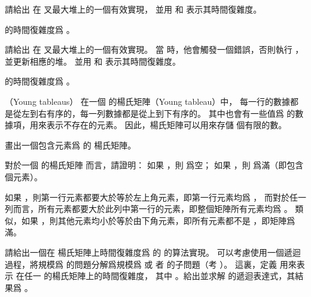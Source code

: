 \startitem
請給出  在  叉最大堆上的一個有效實現，
並用  和  表示其時間復雜度。

\startANSWER
{} 的時間復雜度爲 。
\stopANSWER
\stopitem

\startitem
請給出  在  叉最大堆上的一個有效實現。
當  時，他會觸發一個錯誤，否則執行 ，並更新相應的堆。
並用  和  表示其時間復雜度。

\startANSWER
{} 的時間復雜度爲 。
\stopANSWER
\stopitem
\stopigBase
\stopPROBLEM

\startPROBLEM
（Young tableaus）
在一個  的{\EMP 楊氏矩陣（Young tableau）}中，
每一行的數據都是從左到右有序的，每一列數據都是從上到下有序的。
其中也會有一些值爲 \m{\infty} 的數據項，用來表示不存在的元素。
因此，楊氏矩陣可以用來存儲  個有限的數。


\startigBase[a]\startitem
畫出一個包含元素爲  的  楊氏矩陣。
\stopitem\stopigBase

\startANSWER
\startformula\startpmatrix%
    \NR
{}   \NC \infty \NR
{}  \NC \infty \NC \infty \NR
\NC \infty \NC \infty \NC \infty \NC \infty \NR
\stoppmatrix\stopformula
\stopANSWER

\startigBase[continue]\startitem
對於一個  的楊氏矩陣  而言，請證明：
如果 ，則  爲空；
如果 ，則  爲滿（即包含  個元素）。
\stopitem\stopigBase

\startANSWER
如果 ，則第一行元素都要大於等於左上角元素，即第一行元素均爲 \m{\infty}，
而對於任一列而言，所有元素都要大於此列中第一行的元素，即整個矩陣所有元素均爲 \m{\infty}。
類似，如果 ，則其他元素均小於等於由下角元素，即所有元素都不是 \m{\infty}，即矩陣爲滿。
\stopANSWER

\startigBase[continue]\startitem
請給出一個在  楊氏矩陣上時間復雜度爲  的  的算法實現。
可以考慮使用一個遞迴過程，將規模爲  的問題分解爲規模爲  或
者  的子問題（\hint 考 ）。
這裏，定義  用來表示  在任一  的楊氏矩陣上的時間復雜度，
其中 。給出並求解  的遞迴表達式，其結果爲 。
\stopitem\stopigBase

